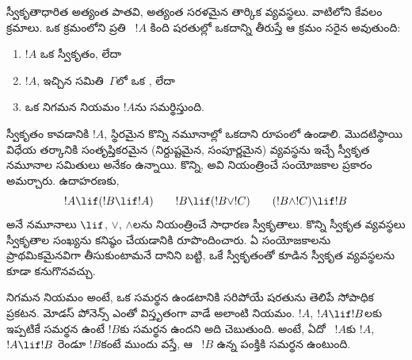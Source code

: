 \documentclass[../../../include/open-logic-section]{subfiles}
\begin{document}
      {}
      {}


స్వీకృతాధారిత  అత్యంత పాతవి, అత్యంత సరళమైన తార్కిక
 వ్యవస్థలు. వాటిలోని  కేవలం
 క్రమాలు. ఒక  క్రమంలోని ప్రతి
~$!A$ కింది షరతుల్లో ఒకదాన్ని తీరుస్తే ఆ క్రమం
సరైన  అవుతుంది:
\begin{enumerate}
\item $!A$ ఒక స్వీకృతం, లేదా
\item $!A$, ఇచ్చిన  సమితి~$\Gamma$లో ఒక , లేదా
\item ఒక నిగమన నియమం $!A$ను సమర్థిస్తుంది.
\end{enumerate}
స్వీకృతం కావడానికి $!A$, స్థిరమైన కొన్ని  నమూనాల్లో
ఒకదాని రూపంలో ఉండాలి. మొదటిస్థాయి విధేయ తర్కానికి సంతృప్తికరమైన
(నిర్దుష్టమైన, సంపూర్ణమైన)  వ్యవస్థను ఇచ్చే స్వీకృత
నమూనాల సమితులు అనేకం ఉన్నాయి. కొన్ని, అవి నియంత్రించే సంయోజకాల
ప్రకారం అమర్చారు. ఉదాహరణకు,
\[
!A \lif (!B \lif !A) \qquad !B \lif (!B \lor !C) \qquad (!B \land !C) \lif !B
\]
అనే నమూనాలు $\lif$, $\lor$, $\land$లను నియంత్రించే సాధారణ
స్వీకృతాలు. కొన్ని స్వీకృత వ్యవస్థలు స్వీకృతాల సంఖ్యను కనిష్ఠం
చేయడానికి రూపొందించారు. ఏ సంయోజకాలను ప్రాథమికమైనవిగా
తీసుకుంటామనే దానిని బట్టి, ఒకే స్వీకృతంతో కూడిన స్వీకృత వ్యవస్థలను
కూడా కనుగొనవచ్చు.

నిగమన నియమం అంటే,  ఒక  సమర్థన
ఉండటానికి సరిపోయే షరతును తెలిపే సోపాధిక ప్రకటన. మోడస్ పోనెన్స్ ఎంతో
విస్తృతంగా వాడే అలాంటి నియమం. $!A$, $!A \lif !B$లకు ఇప్పటికే సమర్థన
ఉంటే $!B$కు సమర్థన ఉందని అది చెబుతుంది. అంటే, ఏదో
~$!A$కు $!A$, $!A \lif !B$ రెండూ 
$!B$కంటే ముందు వస్తే, ఆ  ~$!B$ ఉన్న
పంక్తికి సమర్థన ఉంటుంది.
\end{document}
